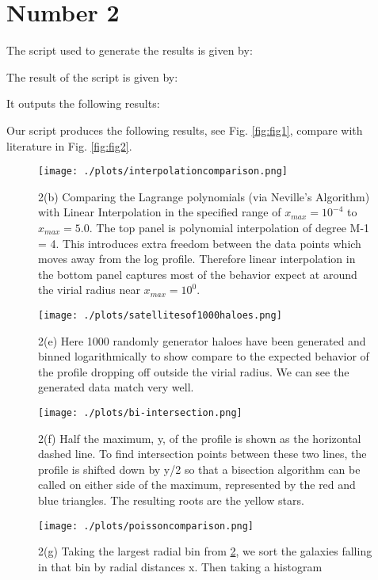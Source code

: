 \section{Number 2}

The script used to generate the results is given by:



The result of the script is given by:

It outputs the following results:



Our script produces the following results, see Fig. \ref{fig:fig1},
compare with literature in Fig. \ref{fig:fig2}.


\begin{figure}[h!]
  \centering
  \texttt{[image: ./plots/interpolationcomparison.png]}
  \caption{2(b) Comparing the Lagrange polynomials (via Neville's Algorithm) with Linear Interpolation in the specified range of $x_{max} = 10^{-4}$ to $x_{max} = 5.0$. The top panel is polynomial interpolation of degree M-1 = 4. This introduces extra freedom between the data points which moves away from the log profile. Therefore linear interpolation in the bottom panel captures most of the behavior expect at around the virial radius near $x_{max} = 10^{0}$. }
  \label{fig:interpcompare}
\end{figure}

\begin{figure}[h!]
  \centering
  \texttt{[image: ./plots/satellitesof1000haloes.png]}
  \caption{2(e) Here 1000 randomly generator haloes have been generated and binned logarithmically to show compare to the expected behavior of the profile dropping off outside the virial radius. We can see the generated data match very well.}
  \label{fig:1000haloes}
\end{figure}


\begin{figure}[h!]
  \centering
  \texttt{[image: ./plots/bi-intersection.png]}
  \caption{2(f) Half the maximum, y, of the profile is shown as the horizontal dashed line. To find intersection points between these two lines, the profile is shifted down by y/2 so that a bisection algorithm can be called on either side of the maximum, represented by the red and blue triangles. The resulting roots are the yellow stars.}
  \label{fig:intersection}
\end{figure}


\begin{figure}[h!]
  \centering
  \texttt{[image: ./plots/poissoncomparison.png]}
  \caption{2(g) Taking the largest radial bin from \ref{fig:1000haloes}, we sort the galaxies falling in that bin by radial distances x. Then taking a histogram}
  \label{fig:comppoisson}
\end{figure}
